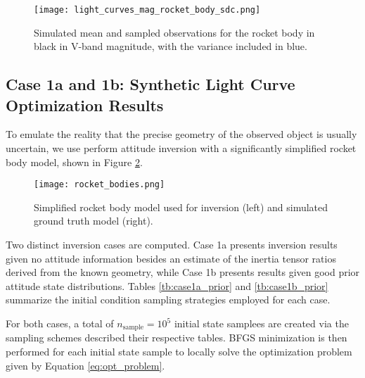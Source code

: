 \documentclass[a4paper,twocolumn]{spaceDebrisC} %
\newcommand{\figmed}[0]{0.4\textwidth}
\newcommand{\figsmall}[0]{0.3\textwidth}
\begin{document}

\begin{figure}[H]
  \centering
  \texttt{[image: light\_curves\_mag\_rocket\_body\_sdc.png]}
  \caption{Simulated mean and sampled observations for the rocket body in black in V-band magnitude, with the variance included in blue.}
  \label{fig:obs_mag_synth}
\end{figure}


\subsection{Case 1a and 1b: Synthetic Light Curve Optimization Results}

To emulate the reality that the precise geometry of the observed object is usually uncertain, we use perform attitude inversion with a significantly simplified rocket body model, shown in Figure \ref{fig:rb_models}.

\begin{figure}[H]
  \centering
  \texttt{[image: rocket\_bodies.png]}
  \caption{Simplified rocket body model used for inversion (left) and simulated ground truth model (right).}
  \label{fig:rb_models}
\end{figure}

Two distinct inversion cases are computed. Case 1a presents inversion results given no attitude information besides an estimate of the inertia tensor ratios derived from the known geometry, while Case 1b presents results given good prior attitude state distributions. Tables \ref{tb:case1a_prior} and \ref{tb:case1b_prior} summarize the initial condition sampling strategies employed for each case.

For both cases, a total of $n_\text{sample}=10^5$ initial state samplees are created via the sampling schemes described their respective tables. BFGS minimization is then performed for each initial state sample to locally solve the optimization problem given by Equation \ref{eq:opt_problem}.
\end{document}
